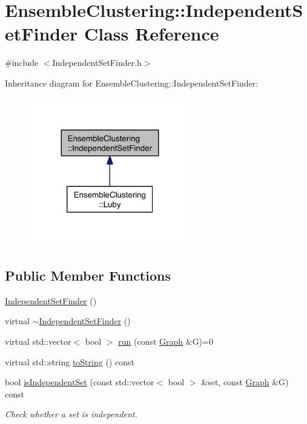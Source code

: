 \hypertarget{class_ensemble_clustering_1_1_independent_set_finder}{\section{Ensemble\-Clustering\-:\-:Independent\-Set\-Finder Class Reference}
\label{class_ensemble_clustering_1_1_independent_set_finder}
}


{\ttfamily \#include $<$Independent\-Set\-Finder.\-h$>$}



Inheritance diagram for Ensemble\-Clustering\-:\-:Independent\-Set\-Finder\-:
\nopagebreak
\begin{figure}[H]
\begin{center}
\leavevmode
\includegraphics[width=200pt]{class_ensemble_clustering_1_1_independent_set_finder__inherit__graph}
\end{center}
\end{figure}
\subsection*{Public Member Functions}
\begin{DoxyCompactItemize}
\item 
\hyperlink{class_ensemble_clustering_1_1_independent_set_finder_a1ef1f4ded8070351805607bc0163b146}{Independent\-Set\-Finder} ()
\item 
virtual \hyperlink{class_ensemble_clustering_1_1_independent_set_finder_ab9b0a8aa5d1f5d875b6032b6e177b9e5}{$\sim$\-Independent\-Set\-Finder} ()
\item 
virtual std\-::vector$<$ bool $>$ \hyperlink{class_ensemble_clustering_1_1_independent_set_finder_a9ad18484a7d2028c2073cd05b8b660b4}{run} (const \hyperlink{class_ensemble_clustering_1_1_graph}{Graph} \&G)=0
\item 
virtual std\-::string \hyperlink{class_ensemble_clustering_1_1_independent_set_finder_a1b2b3caedffea66cfb12bb2f911c2f8a}{to\-String} () const 
\item 
bool \hyperlink{class_ensemble_clustering_1_1_independent_set_finder_a2312fb06a08fb8ce248501868dd9434f}{is\-Independent\-Set} (const std\-::vector$<$ bool $>$ \&set, const \hyperlink{class_ensemble_clustering_1_1_graph}{Graph} \&G) const 
\begin{DoxyCompactList}\small\item\em Check whether a set is independent. \end{DoxyCompactList}\end{DoxyCompactItemize}


